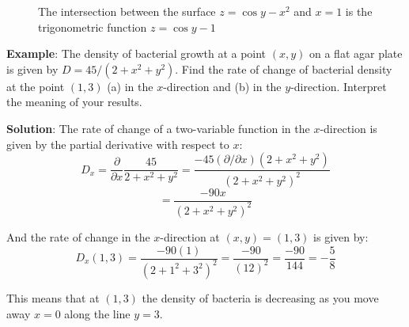 \begin{figure}[htbp]
    \centering
    \caption{The intersection between the surface $z = \cos{y} - x^2$ and 
    $x = 1$ is the trigonometric function $z = \cos{y} - 1$}
    \label{fig:ytangent}
\end{figure}

\textbf{Example}: The density of bacterial growth at a point $(x, y)$ on a 
flat agar plate is given by $D = 45/\left(2 + x^2 + y^2 \right)$. Find the 
rate of change of bacterial density at the point $(1, 3)$ (a) in the 
$x$-direction and (b) in the $y$-direction. Interpret the meaning of your 
results. 

\textbf{Solution}: The rate of change of a two-variable function in the 
$x$-direction is given by the partial derivative with respect to $x$:
$$D_x = \frac{\partial}{\partial x} \frac{45}{2 + x^2 + y^2} = \frac{-45 
\left( \partial/\partial x \right) \left(2 + x^2 + y^2 \right)}{\left(2 + 
x^2 + y^2 \right)^2}$$
$$= \frac{-90x}{\left( 2 + x^2 + y^2 \right)^2}$$

And the rate of change in the $x$-direction at $(x, y) = (1, 3)$ is given by:
$$D_x(1, 3) = \frac{-90(1)}{\left( 2 + 1^2 + 3^2 \right)^2} = \frac{-90}{\left(
12 \right)^2} = \frac{-90}{144} = -\frac{5}{8}$$

This means that at $(1, 3)$ the density of bacteria is decreasing as you move 
away $x = 0$ along the line $y = 3$.

